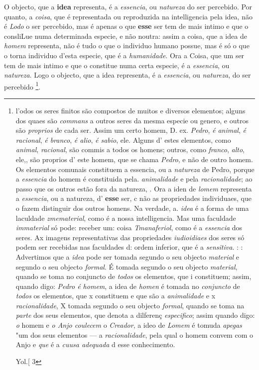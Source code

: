  
O objecto, que a \textbf{idea} representa, é a \emph{essencia}, ou \emph{natureza} do ser percebido. Por quanto, a \emph{coisa}, que é representada ou reproduzida na intelligencia pela idea, não é \emph{Lodo} o ser percebido, mas é apenas o que \textbf{esse} ser tem de mais intimo e que o consliLue numa determinada especie, e não noutra: assim a coisa, que a idea de \emph{homem} representa, não é tudo o que o individuo humano possue, mas é só o que o torna individuo d'esta especie, que é a \emph{humanidade}. Ora a Coisa, que um ser tem de mais intimo e que o constitue numa certa especie, é a \emph{essencia}, ou \emph{natureza}. Logo o objecto, que a idea representa, é a \emph{essencia}, ou \emph{natureza}, do ser percebido \footnote{l'odos os seres finitos são compostos de muitos e diversos elementos; alguns dos quaes são \emph{commans} a outros seres da mesma especie ou genero, e outros são \emph{proprios} de cada ser. Assim um certo homem, D. ex. \emph{Pedro}, \emph{é animal}, \emph{é racional}, \emph{é branco}, \emph{é alio}, \emph{é sabio}, ele. Alguns d' estes elementos, como \emph{animal}, \emph{racional}, são commis a todos os homens; outros, como \emph{franco}, \emph{alto}, ele,, são proprios d' este homem, que se chama \emph{Pedro}, e não de outro homem. Os elementos comunais constituem a essencia, ou a \emph{natureza} de Pedro, porque a \emph{essencia} do homem é constituida pela. \emph{animalidade} e pela \emph{racionalidade}; ao passo que os outros estão fora da natureza, . Ora a iden de \emph{lomem} representa a \emph{essencia}, ou a natureza, d' \textbf{esse} ser, c não as propriedades individuaes, que o fazem distinguir dos outros homens. Na verdade, a. \emph{idea} é a forma de uma laculdade \emph{zmematerial}, como é a nossa intelligencia. Mas uma faculdade \emph{immaterial} só pode: receber um: coisa \emph{Tmanaferiol}, como é a \emph{essencia} dos seres. Ax imagens representativas das propriedades \emph{iudioidiaes} dos seres só podem ser recebidas nas faculdades d: ordem inferior, que é a \emph{sensitiva}. : : Advertimos que a \emph{idea} pode ser tomada segundo o seu objecto \emph{material} e segundo o seu objecto \emph{formal}. É tomada segundo o seu objecto \emph{material}, quando se toma no conjuncto de \emph{todos} os elementos, que i constituem; assim, quando digo: \emph{Pedro é homem}, a idea de \emph{homen} é tomada no \emph{conjuncto} de \emph{todos} os elementos, que x constituem e que são a \emph{animalidade} e x \emph{racionalidade}, X tomada segundo o seu objecto \emph{formal}, quando se toma na \emph{parte} dos seus elementos, que denota a dilferenç \emph{especifico}; assim quando digo: \emph{o} homem e \emph{o Anjo coulecem} o \emph{Creador}, a ideo de \emph{Lomem} é tomuda \emph{apegas} "um dos seus elementos --- a \emph{racionalidade}, pela qual o homem convem com o Anjo e \emph{que} é a \emph{cuusa adequada} d esse conhecimento.\par Yol.[ 3}.

